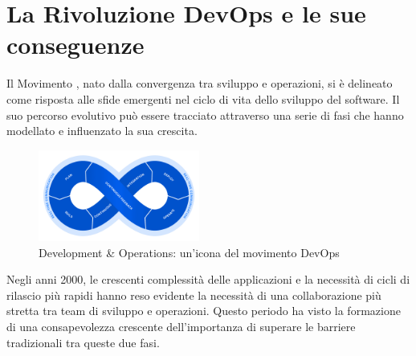 \section{La Rivoluzione DevOps e le sue conseguenze}

Il Movimento , nato dalla convergenza tra sviluppo e operazioni, si è delineato come risposta alle sfide emergenti nel ciclo di vita dello sviluppo del software. Il suo percorso evolutivo può essere tracciato attraverso una serie di fasi che hanno modellato e influenzato la sua crescita.

\begin{figure}[h]
    \centering
    \includegraphics[width=200px]{figures/ch1/devops-flow.png}
    \caption[Development \& Operations: un'icona del movimento DevOps]{Development \& Operations: un'icona del movimento DevOps}
    \label{fig:cha1:devops}
\end{figure}

Negli anni 2000, le crescenti complessità delle applicazioni e la necessità di cicli di rilascio più rapidi hanno reso evidente la necessità di una collaborazione più stretta tra team di sviluppo e operazioni. Questo periodo ha visto la formazione di una consapevolezza crescente dell'importanza di superare le barriere tradizionali tra queste due fasi.

